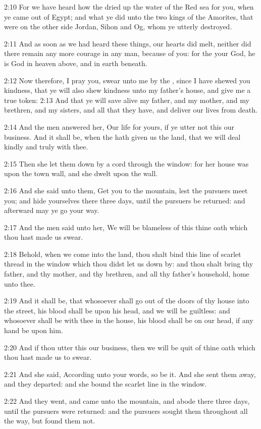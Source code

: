 2:10 For we have heard how the \LORD dried up the water of the Red sea for you, when ye came out of Egypt; and what ye did unto the two kings of the Amorites, that were on the other side Jordan, Sihon and Og, whom ye utterly destroyed.

2:11 And as soon as we had heard these things, our hearts did melt, neither did there remain any more courage in any man, because of you: for the \LORD your God, he is God in heaven above, and in earth beneath.

2:12 Now therefore, I pray you, swear unto me by the \LORD, since I have shewed you kindness, that ye will also shew kindness unto my father's house, and give me a true token: 2:13 And that ye will save alive my father, and my mother, and my brethren, and my sisters, and all that they have, and deliver our lives from death.

2:14 And the men answered her, Our life for yours, if ye utter not this our business. And it shall be, when the \LORD hath given us the land, that we will deal kindly and truly with thee.

2:15 Then she let them down by a cord through the window: for her house was upon the town wall, and she dwelt upon the wall.

2:16 And she said unto them, Get you to the mountain, lest the pursuers meet you; and hide yourselves there three days, until the pursuers be returned: and afterward may ye go your way.

2:17 And the men said unto her, We will be blameless of this thine oath which thou hast made us swear.

2:18 Behold, when we come into the land, thou shalt bind this line of scarlet thread in the window which thou didst let us down by: and thou shalt bring thy father, and thy mother, and thy brethren, and all thy father's household, home unto thee.

2:19 And it shall be, that whosoever shall go out of the doors of thy house into the street, his blood shall be upon his head, and we will be guiltless: and whosoever shall be with thee in the house, his blood shall be on our head, if any hand be upon him.

2:20 And if thou utter this our business, then we will be quit of thine oath which thou hast made us to swear.

2:21 And she said, According unto your words, so be it. And she sent them away, and they departed: and she bound the scarlet line in the window.

2:22 And they went, and came unto the mountain, and abode there three days, until the pursuers were returned: and the pursuers sought them throughout all the way, but found them not.

